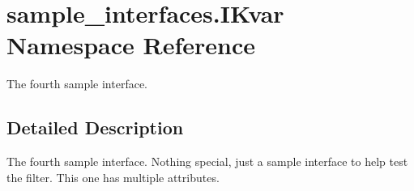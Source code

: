 \hypertarget{namespacesample__interfaces_1_1_i_kvar}{\section{sample\-\_\-interfaces.\-I\-Kvar Namespace Reference}
\label{namespacesample__interfaces_1_1_i_kvar}
}


The fourth sample interface.  




\subsection{Detailed Description}
The fourth sample interface. Nothing special, just a sample interface to help test the filter. This one has multiple attributes. 